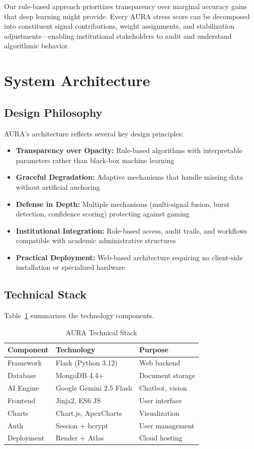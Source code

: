 \documentclass[journal]{IEEEtran}
\begin{document}
Our rule-based approach prioritizes transparency over marginal accuracy gains that deep learning might provide. Every AURA stress score can be decomposed into constituent signal contributions, weight assignments, and stabilization adjustments—enabling institutional stakeholders to audit and understand algorithmic behavior.

\section{System Architecture}
\label{sec:architecture}

\subsection{Design Philosophy}

AURA's architecture reflects several key design principles:

\begin{itemize}
    \item \textbf{Transparency over Opacity:} Rule-based algorithms with interpretable parameters rather than black-box machine learning
    \item \textbf{Graceful Degradation:} Adaptive mechanisms that handle missing data without artificial anchoring
    \item \textbf{Defense in Depth:} Multiple mechanisms (multi-signal fusion, burst detection, confidence scoring) protecting against gaming
    \item \textbf{Institutional Integration:} Role-based access, audit trails, and workflows compatible with academic administrative structures
    \item \textbf{Practical Deployment:} Web-based architecture requiring no client-side installation or specialized hardware
\end{itemize}

\subsection{Technical Stack}

Table~\ref{tab:techstack} summarizes the technology components.

\begin{table}[htbp]
\caption{AURA Technical Stack}
\label{tab:techstack}
\centering
\begin{tabular}{lll}
\toprule
\textbf{Component} & \textbf{Technology} & \textbf{Purpose} \\
\midrule
Framework & Flask (Python 3.12) & Web backend \\
Database & MongoDB 4.4+ & Document storage \\
AI Engine & Google Gemini 2.5 Flash & Chatbot, vision \\
Frontend & Jinja2, ES6 JS & User interface \\
Charts & Chart.js, ApexCharts & Visualization \\
Auth & Session + bcrypt & User management \\
Deployment & Render + Atlas & Cloud hosting \\
\bottomrule
\end{tabular}
\end{table}
\end{document}
